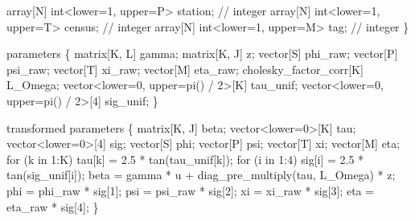 \documentclass[
  12pt,
  letterpaper,
  DIV=11,
  numbers=noendperiod]{scrartcl}
\newenvironment{Shaded}{\begin{snugshade}}{\end{snugshade}}
\newcommand{\CommentTok}[1]{\textcolor[rgb]{0.37,0.37,0.37}{#1}}
\newcommand{\ControlFlowTok}[1]{\textcolor[rgb]{0.00,0.23,0.31}{#1}}
\newcommand{\DataTypeTok}[1]{\textcolor[rgb]{0.68,0.00,0.00}{#1}}
\newcommand{\DecValTok}[1]{\textcolor[rgb]{0.68,0.00,0.00}{#1}}
\newcommand{\FloatTok}[1]{\textcolor[rgb]{0.68,0.00,0.00}{#1}}
\newcommand{\KeywordTok}[1]{\textcolor[rgb]{0.00,0.23,0.31}{#1}}
\newcommand{\NormalTok}[1]{\textcolor[rgb]{0.00,0.23,0.31}{#1}}
\begin{document}
\begin{Shaded}
\begin{Highlighting}[]
  \DataTypeTok{array}\NormalTok{[N] }\DataTypeTok{int}\NormalTok{\textless{}}\KeywordTok{lower}\NormalTok{=}\DecValTok{1}\NormalTok{, }\KeywordTok{upper}\NormalTok{=P\textgreater{} station; }\CommentTok{// integer}
  \DataTypeTok{array}\NormalTok{[N] }\DataTypeTok{int}\NormalTok{\textless{}}\KeywordTok{lower}\NormalTok{=}\DecValTok{1}\NormalTok{, }\KeywordTok{upper}\NormalTok{=T\textgreater{} census; }\CommentTok{// integer}
  \DataTypeTok{array}\NormalTok{[N] }\DataTypeTok{int}\NormalTok{\textless{}}\KeywordTok{lower}\NormalTok{=}\DecValTok{1}\NormalTok{, }\KeywordTok{upper}\NormalTok{=M\textgreater{} tag; }\CommentTok{// integer}
\NormalTok{\}}

\KeywordTok{parameters}\NormalTok{ \{}
  \DataTypeTok{matrix}\NormalTok{[K, L] gamma;}
  \DataTypeTok{matrix}\NormalTok{[K, J] z;}
  \DataTypeTok{vector}\NormalTok{[S] phi\_raw;}
  \DataTypeTok{vector}\NormalTok{[P] psi\_raw;}
  \DataTypeTok{vector}\NormalTok{[T] xi\_raw;}
  \DataTypeTok{vector}\NormalTok{[M] eta\_raw;}
  \DataTypeTok{cholesky\_factor\_corr}\NormalTok{[K] L\_Omega;}
  \DataTypeTok{vector}\NormalTok{\textless{}}\KeywordTok{lower}\NormalTok{=}\DecValTok{0}\NormalTok{, }\KeywordTok{upper}\NormalTok{=pi() / }\DecValTok{2}\NormalTok{\textgreater{}[K] tau\_unif;}
  \DataTypeTok{vector}\NormalTok{\textless{}}\KeywordTok{lower}\NormalTok{=}\DecValTok{0}\NormalTok{, }\KeywordTok{upper}\NormalTok{=pi() / }\DecValTok{2}\NormalTok{\textgreater{}[}\DecValTok{4}\NormalTok{] sig\_unif;}
\NormalTok{\}}

\KeywordTok{transformed parameters}\NormalTok{ \{}
  \DataTypeTok{matrix}\NormalTok{[K, J] beta;}
  \DataTypeTok{vector}\NormalTok{\textless{}}\KeywordTok{lower}\NormalTok{=}\DecValTok{0}\NormalTok{\textgreater{}[K] tau;}
  \DataTypeTok{vector}\NormalTok{\textless{}}\KeywordTok{lower}\NormalTok{=}\DecValTok{0}\NormalTok{\textgreater{}[}\DecValTok{4}\NormalTok{] sig;}
  \DataTypeTok{vector}\NormalTok{[S] phi;}
  \DataTypeTok{vector}\NormalTok{[P] psi;}
  \DataTypeTok{vector}\NormalTok{[T] xi;}
  \DataTypeTok{vector}\NormalTok{[M] eta;}
  \ControlFlowTok{for}\NormalTok{ (k }\ControlFlowTok{in} \DecValTok{1}\NormalTok{:K) tau[k] = }\FloatTok{2.5}\NormalTok{ * tan(tau\_unif[k]);}
  \ControlFlowTok{for}\NormalTok{ (i }\ControlFlowTok{in} \DecValTok{1}\NormalTok{:}\DecValTok{4}\NormalTok{) sig[i] = }\FloatTok{2.5}\NormalTok{ * tan(sig\_unif[i]);}
\NormalTok{  beta = gamma * u + diag\_pre\_multiply(tau, L\_Omega) * z;}
\NormalTok{  phi = phi\_raw * sig[}\DecValTok{1}\NormalTok{];}
\NormalTok{  psi = psi\_raw * sig[}\DecValTok{2}\NormalTok{];}
\NormalTok{  xi = xi\_raw * sig[}\DecValTok{3}\NormalTok{];}
\NormalTok{  eta = eta\_raw * sig[}\DecValTok{4}\NormalTok{];}
\NormalTok{\}}


\end{Highlighting}
\end{Shaded}
\end{document}
